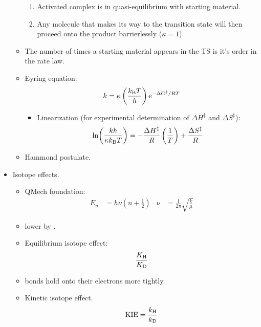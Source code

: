 \documentclass[../notes.tex]{subfiles}
\begin{document}
\begin{itemize}
\begin{itemize}
        \begin{enumerate}
            \item Activated complex is in quasi-equilibrium with starting material.
            \item Any molecule that makes its way to the transition state will then proceed onto the product barrierlessly ($\kappa=1$).
        \end{enumerate}
        \item The number of times a starting material appears in the TS is it's order in the rate law.
        \item Eyring equation:
        \begin{equation*}
            k = \kappa\left( \frac{\kB T}{h} \right)\e[-\Delta G^\ddagger/RT]
        \end{equation*}
        \begin{itemize}
            \item Linearization (for experimental determination of $\Delta H^\ddagger$ and $\Delta S^\ddagger$):
            \begin{equation*}
                \ln(\frac{kh}{\kappa\kB T}) = -\frac{\Delta H^\ddagger}{R}\left( \frac{1}{T} \right)+\frac{\Delta S^\ddagger}{R}
            \end{equation*}
        \end{itemize}
        \item Hammond postulate.
    \end{itemize}
    \item Isotope effects.
    \begin{itemize}
        \item QMech foundation:
        \begin{align*}
            E_n &= h\nu\left( n+\frac{1}{2} \right)&
            \nu &= \frac{1}{2\pi}\sqrt{\frac{k}{\mu}}
        \end{align*}
        \item {} lower by .
        \item Equilibrium isotope effect:
        \begin{equation*}
            \frac{K_{\ce{H}}}{K_{\ce{D}}}
        \end{equation*}
        \item {} bonds hold onto their electrons more tightly.
        \item Kinetic isotope effect.
        \begin{equation*}
            \KIE = \frac{k_{\ce{H}}}{k_{\ce{D}}}

\end{equation*}
\end{itemize}
\end{itemize}
\end{document}
